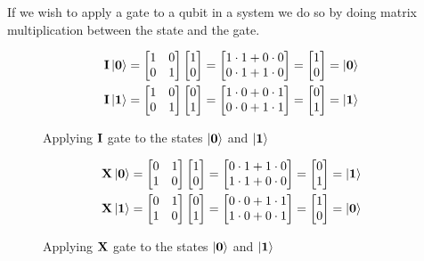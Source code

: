 \noindent
If we wish to apply a gate to a qubit in a system we do so by doing matrix multiplication between the state and the gate. 
\begin{figure}[H]
    \centering
    \begin{align*}
        \mathbf{I}\ket{\mathbf{0}}&=\begin{bmatrix} 1 & 0\\ 0 & 1\\ \end{bmatrix}\begin{bmatrix} 1\\ 0\\ \end{bmatrix}=
        \begin{bmatrix}
            1 \cdot 1 + 0 \cdot 0\\
            0 \cdot 1 + 1 \cdot 0\\
        \end{bmatrix}=
        \begin{bmatrix} 1\\ 0\\ \end{bmatrix}=\ket{\mathbf{0}}\\
        \mathbf{I}\ket{\mathbf{1}}&=\begin{bmatrix} 1 & 0\\ 0 & 1\\ \end{bmatrix}\begin{bmatrix} 0\\ 1\\ \end{bmatrix}=
        \begin{bmatrix}
            1 \cdot 0 + 0 \cdot 1\\
            0 \cdot 0 + 1 \cdot 1\\
        \end{bmatrix}=
        \begin{bmatrix} 0\\ 1\\ \end{bmatrix}=\ket{\mathbf{1}}
    \end{align*}
    \caption{Applying $\mathbf{I}$ gate to the states $\ket{\mathbf{0}}$ and $\ket{\mathbf{1}}$}
    \label{fig:i}
\end{figure}

\begin{figure}[H]
    \centering
    \begin{align*}
        \mathbf{X}\ket{\mathbf{0}}&=\begin{bmatrix} 0 & 1\\ 1 & 0\\ \end{bmatrix}\begin{bmatrix} 1\\ 0\\ \end{bmatrix}=
        \begin{bmatrix}
            0 \cdot 1 + 1 \cdot 0\\
            1 \cdot 1 + 0 \cdot 0\\
        \end{bmatrix}=
        \begin{bmatrix} 0\\ 1\\ \end{bmatrix}=\ket{\mathbf{1}}\\
        \mathbf{X}\ket{\mathbf{1}}&=\begin{bmatrix} 0 & 1\\ 1 & 0\\ \end{bmatrix}\begin{bmatrix} 0\\ 1\\ \end{bmatrix}=
        \begin{bmatrix}
            0 \cdot 0 + 1 \cdot 1\\
            1 \cdot 0 + 0 \cdot 1\\
        \end{bmatrix}=
        \begin{bmatrix} 1\\ 0\\ \end{bmatrix}=\ket{\mathbf{0}}
    \end{align*}
    \caption{Applying $\mathbf{X}$ gate to the states $\ket{\mathbf{0}}$ and $\ket{\mathbf{1}}$}
    \label{fig:x}
\end{figure}

